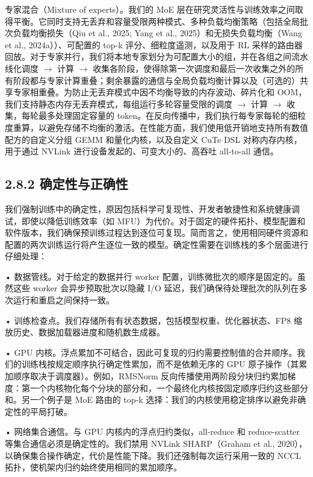 专家混合（Mixture of experts）。我们的 MoE 层在研究灵活性与训练效率之间取得平衡。它同时支持无丢弃和容量受限两种模式、多种负载均衡策略（包括全局批次负载均衡损失（Qiu et al., 2025; Yang et al., 2025）和无损失负载均衡（Wang et al., 2024a））、可配置的 top-k 评分、细粒度遥测，以及用于 RL 采样的路由器回放。对于专家并行，我们将本地专家划分为可配置大小的组，并在各组之间流水线化调度 $\to$ 计算 $\to$ 收集各阶段，使得除第一次调度和最后一次收集之外的所有阶段都与专家计算重叠；剩余暴露的通信与全局负载均衡计算以及（可选的）共享专家相重叠。为防止无丢弃模式中因不均衡导致的内存波动、碎片化和 OOM，我们支持静态内存无丢弃模式，每组运行多轮容量受限的调度 $\to$ 计算 $\to$ 收集，每轮最多处理固定容量的 token。在反向传播中，我们执行每专家每轮的细粒度重算，以避免存储不均衡的激活。在性能方面，我们使用低开销地支持所有数值配方的自定义分组 GEMM 和量化内核，以及自定义 CuTe DSL 对称内存内核，用于通过 NVLink 进行设备发起的、可变大小的、高吞吐 all-to-all 通信。

\subsection{2.8.2 确定性与正确性}\label{determinism-and-correctness}

我们强制训练中的确定性，原因包括科学可复现性、开发者敏捷性和系统健康调试，即使以降低训练效率（如 MFU）为代价。对于固定的硬件拓扑、模型配置和软件版本，我们确保预训练过程达到逐位可复现。简而言之，使用相同硬件资源和配置的两次训练运行将产生逐位一致的模型。确定性需要在训练栈的多个层面进行仔细处理：



• 数据管线。对于给定的数据并行 worker 配置，训练微批次的顺序是固定的。虽然这些 worker 会异步预取批次以隐藏 I/O 延迟，我们确保待处理批次的队列在多次运行和重启之间保持一致。

• 训练检查点。我们存储所有有状态数据，包括模型权重、优化器状态、FP8 缩放历史、数据加载器进度和随机数生成器。

• GPU 内核。浮点累加不可结合，因此可复现的归约需要控制值的合并顺序。我们的训练栈按规定顺序执行确定性累加，而不是依赖无序的 GPU 原子操作（其累加顺序取决于调度器）。例如，RMSNorm 反向传播使用两阶段分块归约累加梯度：第一个内核物化每个分块的部分和，一个最终化内核按固定顺序归约这些部分和。另一个例子是 MoE 路由的 top-k 选择：我们的内核使用稳定排序以避免非确定性的平局打破。

• 网络集合通信。与 GPU 内核内的浮点归约类似，all-reduce 和 reduce-scatter 等集合通信必须是确定性的。我们禁用 NVLink SHARP（Graham et al., 2020），以确保集合操作确定，代价是性能下降。我们还强制每次运行采用一致的 NCCL 拓扑，使机架内归约始终使用相同的累加顺序。

